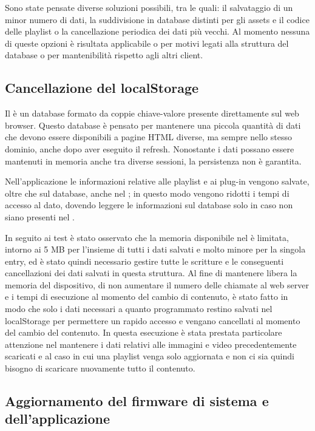 Sono state pensate diverse soluzioni possibili, tra le quali: il salvataggio di un minor numero di dati, la suddivisione in database distinti per gli assets e il codice delle playlist o la cancellazione periodica dei dati più vecchi. Al momento nessuna di queste opzioni è risultata applicabile o per motivi legati alla struttura del database o per mantenibilità rispetto agli altri client.

\subsection{Cancellazione del localStorage} \label{freestorage}

Il  è un database formato da coppie chiave-valore presente direttamente sul web browser. Questo database è pensato per mantenere una piccola quantità di dati che devono essere disponibili a pagine HTML diverse, ma sempre nello stesso dominio, anche dopo aver eseguito il refresh. Nonostante i dati possano essere mantenuti in memoria anche tra diverse sessioni, la persistenza non è garantita.  

Nell'applicazione le informazioni relative alle playlist e ai plug-in vengono salvate, oltre che sul database, anche nel ; in questo modo vengono ridotti i tempi di accesso al dato, dovendo leggere le informazioni sul database solo in caso non siano presenti nel .

In seguito ai test è stato osservato che la memoria disponibile nel  è limitata, intorno ai 5 MB per l'insieme di tutti i dati salvati e molto minore per la singola entry, ed è stato quindi necessario gestire tutte le scritture e le conseguenti cancellazioni dei dati salvati in questa struttura. Al fine di mantenere libera la memoria del dispositivo, di non aumentare il numero delle chiamate al web server e i tempi di esecuzione al momento del cambio di contenuto, è stato fatto in modo che solo i dati necessari a quanto programmato restino salvati nel localStorage per permettere un rapido accesso e vengano cancellati al momento del cambio del contenuto. In questa esecuzione è stata prestata particolare attenzione nel mantenere i dati relativi alle immagini e video precedentemente scaricati e al caso in cui una playlist venga solo aggiornata e non ci sia quindi bisogno di scaricare nuovamente tutto il contenuto.

\subsection{Aggiornamento del firmware di sistema e dell'applicazione}\label{update}


